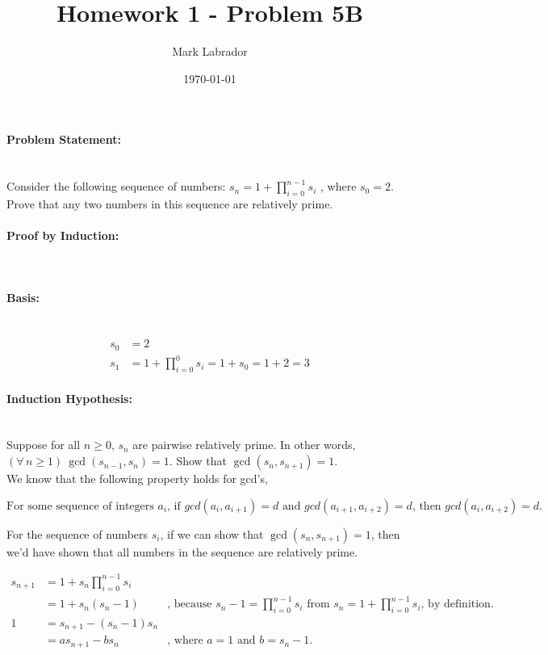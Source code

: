 \documentclass[fleqn]{article}
\title{Homework 1 - Problem 5B}
\author{Mark Labrador}
\date{\today}
\begin{document}
\maketitle
\paragraph{Problem Statement:} ~\\
Consider the following sequence of numbers: $s_{n} = 1 + \prod\limits_{i=0}^{n-1} s_{i}$ , where $s_{0} = 2$. Prove that any two numbers in this sequence are relatively prime.

\paragraph{Proof by Induction:} ~\\

\paragraph{Basis:} ~\\
\begin{align*}
	s_{0} &= 2 \\
	s_{1} &= 1 + \prod\limits_{i=0}^{0} s_{i} = 1 + s_{0} = 1 + 2 = 3
\end{align*}

\paragraph{Induction Hypothesis: } ~\\
Suppose for all $n \ge 0$, $s_{n}$ are pairwise relatively prime.  In other words, $(\forall\, n \ge 1)\ \gcd\left(s_{n-1}, s_{n}\right)=1$.  Show that $\gcd\left(s_{n}, s_{n+1}\right)=1$.\\

\noindent
We know that the following property holds for gcd's, 

\begin{equation}\label{eq:trans_gcd}
\text{For some sequence of integers } a_{i}\text{, if } gcd(a_{i}, a_{i+1})=d \text{ and } gcd(a_{i+1}, a_{i+2})=d\text{, then } gcd(a_{i}, a_{i+2})=d.
\end{equation}

\noindent
For the sequence of numbers $s_{i}$, if we can show that $\gcd\left(s_{n}, s_{n+1}\right)=1$, then we'd have shown that all numbers in the sequence are relatively prime.

\begin{align*}
	s_{n+1} &= 1 + s_{n}\prod\limits_{i=0}^{n-1} s_{i} \\
	&= 1 + s_{n}\left(s_{n}-1\right) &\text{, because } s_{n}-1 = \prod\limits_{i=0}^{n-1} s_{i} \text{ from } s_{n} = 1 + \prod\limits_{i=0}^{n-1} s_{i} \text{, by definition.} \\
	1 &= s_{n+1} - \left(s_{n}-1\right)s_{n} \\
	&= as_{n+1} - bs_{n} &\text{, where $a=1$ and $b=s_{n} - 1$.}
\end{align*}
\end{document}
